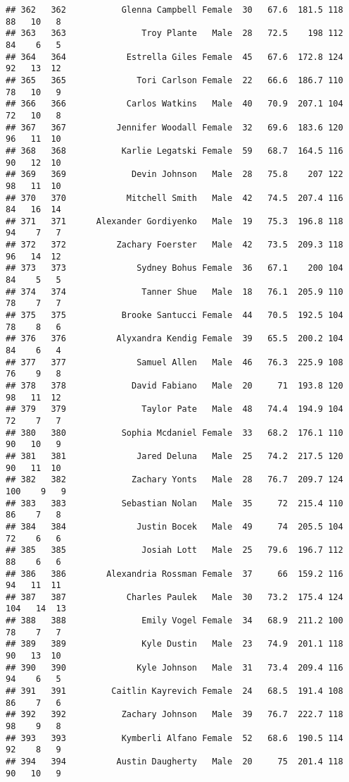 \documentclass[
]{article}
\begin{document}
\begin{verbatim}
## 362   362           Glenna Campbell Female  30   67.6  181.5 118  88   10   8
## 363   363               Troy Plante   Male  28   72.5    198 112  84    6   5
## 364   364            Estrella Giles Female  45   67.6  172.8 124  92   13  12
## 365   365              Tori Carlson Female  22   66.6  186.7 110  78   10   9
## 366   366            Carlos Watkins   Male  40   70.9  207.1 104  72   10   8
## 367   367          Jennifer Woodall Female  32   69.6  183.6 120  96   11  10
## 368   368           Karlie Legatski Female  59   68.7  164.5 116  90   12  10
## 369   369             Devin Johnson   Male  28   75.8    207 122  98   11  10
## 370   370            Mitchell Smith   Male  42   74.5  207.4 116  84   16  14
## 371   371      Alexander Gordiyenko   Male  19   75.3  196.8 118  94    7   7
## 372   372          Zachary Foerster   Male  42   73.5  209.3 118  96   14  12
## 373   373              Sydney Bohus Female  36   67.1    200 104  84    5   5
## 374   374               Tanner Shue   Male  18   76.1  205.9 110  78    7   7
## 375   375           Brooke Santucci Female  44   70.5  192.5 104  78    8   6
## 376   376          Alyxandra Kendig Female  39   65.5  200.2 104  84    6   4
## 377   377              Samuel Allen   Male  46   76.3  225.9 108  76    9   8
## 378   378             David Fabiano   Male  20     71  193.8 120  98   11  12
## 379   379               Taylor Pate   Male  48   74.4  194.9 104  72    7   7
## 380   380           Sophia Mcdaniel Female  33   68.2  176.1 110  90   10   9
## 381   381              Jared Deluna   Male  25   74.2  217.5 120  90   11  10
## 382   382             Zachary Yonts   Male  28   76.7  209.7 124 100    9   9
## 383   383           Sebastian Nolan   Male  35     72  215.4 110  86    7   8
## 384   384              Justin Bocek   Male  49     74  205.5 104  72    6   6
## 385   385               Josiah Lott   Male  25   79.6  196.7 112  88    6   6
## 386   386        Alexandria Rossman Female  37     66  159.2 116  94   11  11
## 387   387            Charles Paulek   Male  30   73.2  175.4 124 104   14  13
## 388   388               Emily Vogel Female  34   68.9  211.2 100  78    7   7
## 389   389               Kyle Dustin   Male  23   74.9  201.1 118  90   13  10
## 390   390              Kyle Johnson   Male  31   73.4  209.4 116  94    6   5
## 391   391         Caitlin Kayrevich Female  24   68.5  191.4 108  86    7   6
## 392   392           Zachary Johnson   Male  39   76.7  222.7 118  98    9   8
## 393   393           Kymberli Alfano Female  52   68.6  190.5 114  92    8   9
## 394   394          Austin Daugherty   Male  20     75  201.4 118  90   10   9

\end{verbatim}
\end{document}
